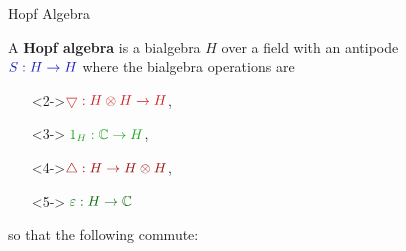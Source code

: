 \documentclass{beamer}
\newcommand\1{_{(1)}}
\newcommand\2{_{(2)}}
\begin{document}
\begin{frame}[fragile]{Hopf Algebra}

A \textbf{Hopf algebra} is a bialgebra $H$ over a field with an antipode \\\;\;\;\;\;\;\;\;$\color{darkblue}S:H\to H$ \;\;\;where the bialgebra operations are 
\vspace{-2ex}
\begin{multicols}{2}
\begin{itemize}
\item[]<2->$\color{lightred}\bigtriangledown:H\otimes H\to H$, 
\item[]<3->$\color{lightgreen}\;1_H:\mathbb{C}\to H$, 
\item[]<4->$\color{darkred}\triangle:H\to H\otimes H$, 
\item[]<5->$\color{darkgreen}\;\varepsilon:H\to\mathbb{C}$
\end{itemize}
\end{multicols}
\vspace{-2ex}
\pause so that the following commute:


\end{frame}
\end{document}
